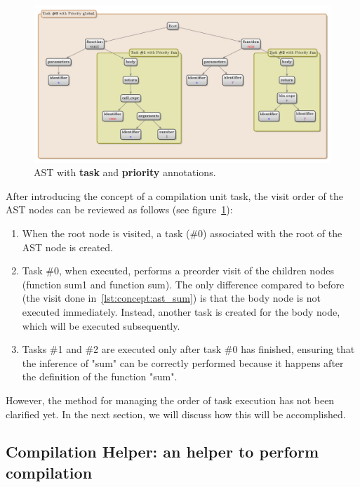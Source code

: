 \begin{figure}[t]
    \centering
    \includegraphics[width=0.9\linewidth]{figs/concept/simple_ast_annotated.pdf}
    \caption{AST with \textbf{task} and \textbf{priority} annotations.}
    \label{lst:concept:ast_sum_annotated}
\end{figure}

After introducing the concept of a compilation unit task, the visit order of the AST nodes can be reviewed as follows (see figure~\ref{lst:concept:ast_sum_annotated}):

\begin{enumerate}
    \item When the root node is visited, a task (\#0) associated with the root of the AST node is created.
    \item Task \#0, when executed, performs a preorder visit of the children nodes (function sum1 and function sum). The only difference compared to before (the visit done in~\ref{lst:concept:ast_sum}) is that the body node is not executed immediately. Instead, another task is created for the body node, which will be executed subsequently.
    \item Tasks \#1 and \#2 are executed only after task \#0 has finished, ensuring that the inference of "sum" can be correctly performed because it happens after the definition of the function "sum".
\end{enumerate}

However, the method for managing the order of task execution has not been clarified yet. In the next section, we will discuss how this will be accomplished.

\subsection{Compilation Helper: an helper to perform compilation}\label{subsec:concept:CompilationHelperAnHelperToPerformCompilation}

